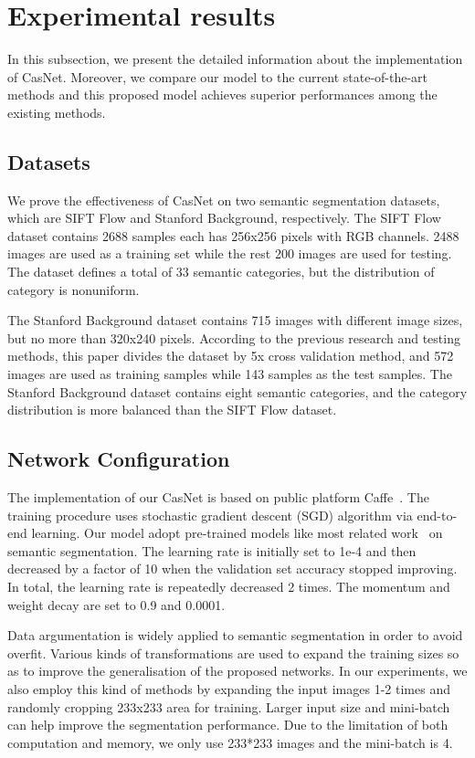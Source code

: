 \documentclass[10.5pt,compsoc]{TsT}
\newcommand{\upcite}[1]{\superscript{\textsuperscript{\cite{#1}}}}
\theoremstyle{mystyle}
\newcommand{\upcite}[1]{\textsuperscript{\cite{#1}}}
\begin{document}
{\section{Experimental results}
\label{s:results}
\noindent
In this subsection, we present the detailed information about the implementation of CasNet. Moreover, we compare our model to the current state-of-the-art methods and this proposed model achieves superior performances among the existing methods.

\subsection{Datasets}
\noindent
We prove the effectiveness of CasNet on two semantic segmentation datasets, which are SIFT Flow and Stanford Background, respectively. The SIFT Flow dataset contains 2688 samples each has 256x256 pixels with RGB channels. 2488 images are used as a training set while the rest 200 images are used for testing. The dataset defines a total of 33 semantic categories, but the distribution of category is nonuniform.

The Stanford Background dataset contains 715 images with different image sizes, but no more than 320x240 pixels. According to the previous research and testing methods, this paper divides the dataset by 5x cross validation method, and 572 images are used as training samples while 143 samples as the test samples. The Stanford Background dataset contains eight semantic categories, and the category distribution is more balanced than the SIFT Flow dataset.


\subsection{Network Configuration}
\noindent
The implementation of our CasNet is based on public platform Caffe~\upcite{23}. The training procedure uses stochastic gradient descent (SGD) algorithm via end-to-end learning. Our model adopt pre-trained models like most related work~\cite{21} on semantic segmentation. The learning rate is initially set to 1e-4 and then decreased by a factor of 10 when the validation set accuracy stopped improving. In total, the learning rate is repeatedly decreased 2 times. The momentum and weight decay are set to 0.9 and 0.0001.

Data argumentation is widely applied to semantic segmentation in order to avoid overfit. Various kinds of transformations are used to expand the training sizes so as to improve the generalisation of the proposed networks. In our experiments, we also employ this kind of methods by expanding the input images 1-2 times and randomly cropping 233x233  area for training.  Larger input size and mini-batch can help improve the segmentation performance. Due to the limitation of both computation and memory, we only use 233*233 images and the mini-batch is 4.



}
\end{document}
